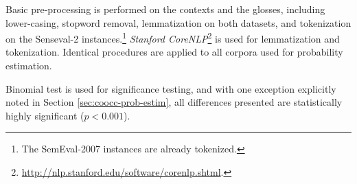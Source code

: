 \documentclass[11pt]{article}
\begin{document}


Basic pre-processing is performed on the contexts and the glosses,
including lower-casing, stopword removal, lemmatization on both
datasets, and tokenization on the Senseval-2 instances.\footnote{The
  SemEval-2007 instances are already tokenized.} \textit{Stanford
  CoreNLP}\footnote{\url{http://nlp.stanford.edu/software/corenlp.shtml}.}
is used for lemmatization and tokenization. Identical procedures are
applied to all corpora used for probability estimation.

Binomial test is used for significance testing, and with one exception
explicitly noted in Section \ref{sec:coocc-prob-estim}, all
differences presented are statistically highly significant
($p<0.001$).
\end{document}
